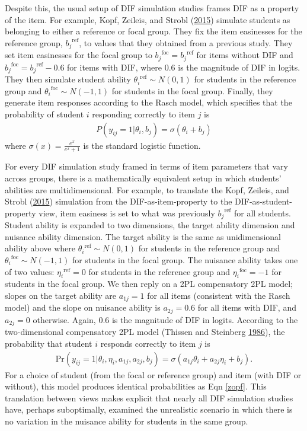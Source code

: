 \documentclass[
  11pt,
]{article}
\begin{document}
Despite this, the usual setup of DIF simulation studies frames DIF as a property of the item. For example, Kopf, Zeileis, and Strobl (\protect\hyperlink{ref-kopf2015framework}{2015}) simulate students as belonging to either a reference or focal group. They fix the item easinesses for the reference group, \({b_j}^{\text{ref}}\), to values that they obtained from a previous study. They set item easinesses for the focal group to \({b_j}^{\text{foc}} = {b_j}^{\text{ref}}\) for items without DIF and \({b_j}^{\text{foc}} = {b_j}^{\text{ref}} - 0.6\) for items with DIF, where 0.6 is the magnitude of DIF in logits. They then simulate student ability \({\theta_i}^{\text{ref}} \sim N(0,1)\) for students in the reference group and \({\theta_i}^{\text{foc}} \sim N(-1,1)\) for students in the focal group. Finally, they generate item responses according to the Rasch model, which specifies that the probability of student \(i\) responding correctly to item \(j\) is
\begin{align}
P(y_{ij} = 1 | \theta_i, b_j) = \sigma(\theta_i + b_j) \label{zopf}
\end{align}
where \(\sigma(x) = \frac{e^x}{e^x + 1}\) is the standard logistic function.

For every DIF simulation study framed in terms of item parameters that vary across groups, there is a mathematically equivalent setup in which students' abilities are multidimensional. For example, to translate the Kopf, Zeileis, and Strobl (\protect\hyperlink{ref-kopf2015framework}{2015}) simulation from the DIF-as-item-property to the DIF-as-student-property view, item easiness is set to what was previously \({b_j}^{\text{ref}}\) for all students. Student ability is expanded to two dimensions, the target ability dimension and nuisance ability dimension. The target ability is the same as unidimensional ability above where \({\theta_i}^{\text{ref}} \sim N(0,1)\) for students in the reference group and \({\theta_i}^{\text{foc}} \sim N(-1,1)\) for students in the focal group. The nuisance ability takes one of two values: \({\eta_i}^{\text{ref}} = 0\) for students in the reference group and \({\eta_i}^{\text{foc}} = -1\) for students in the focal group. We then reply on a 2PL compensatory 2PL model; slopes on the target ability are \(a_{1j} = 1\) for all items (consistent with the Rasch model) and the slope on nuisance ability is \(a_{2j} = 0.6\) for all items with DIF, and \(a_{2j} = 0\) otherwise. Again, 0.6 is the magnitude of DIF in logits. According to the two-dimensional compensatory 2PL model (Thissen and Steinberg \protect\hyperlink{ref-thissen1986taxonomy}{1986}), the probability that student \(i\) responds correctly to item \(j\) is
\begin{align}
\text{Pr}(y_{ij} = 1 | \theta_i, \eta_i, a_{1j}, a_{2j}, b_j) = \sigma(a_{1j}\theta_i + a_{2j}\eta_i + b_j).
\end{align}
For a choice of student (from the focal or reference group) and item (with DIF or without), this model produces identical probabilities as Eqn \ref{zopf}. This translation between views makes explicit that nearly all DIF simulation studies have, perhaps suboptimally, examined the unrealistic scenario in which there is no variation in the nuisance ability for students in the same group.
\end{document}

